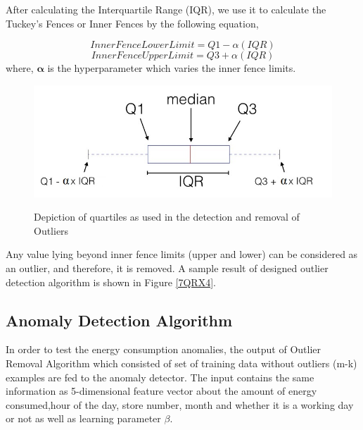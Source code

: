 \documentclass[12pt]{article}
\begin{document}
After calculating the Interquartile Range (IQR), we use it to calculate the Tuckey's Fences or Inner Fences by the following equation,

\begin{equation}
Inner Fence Lower Limit = Q1 - \alpha(IQR)
\end{equation}
\begin{equation}
Inner Fence Upper Limit = Q3 + \alpha(IQR)
\end{equation}
       where, \newline $\mathbf{\alpha}$ is the hyperparameter which varies the inner fence limits.

\begin{figure}[H]
	\centering
	{\includegraphics[scale=0.60]{quartiles.jpg}\label{4blockdiag}
	}
	\caption[The Block Diagram of the designed application]{Depiction of quartiles as used in the detection and removal of Outliers}
	\label{4blockdiag}
	\hspace{0.7cm}%
\end{figure}



Any value lying beyond inner fence limits (upper and lower) can be considered as an outlier, and therefore, it is removed. A sample result of designed outlier detection algorithm is shown in Figure \ref{7QRX4}.






\subsection{Anomaly Detection Algorithm}
\label{anomalies}
In order to test the energy consumption anomalies, the output of Outlier Removal Algorithm which consisted of set of training data without outliers (m-k) examples are fed to the anomaly detector. The input contains the same information as 5-dimensional feature vector about the amount of energy consumed,hour of the day, store number, month and whether it is a working day or not as well as learning parameter $\beta$.
\end{document}

